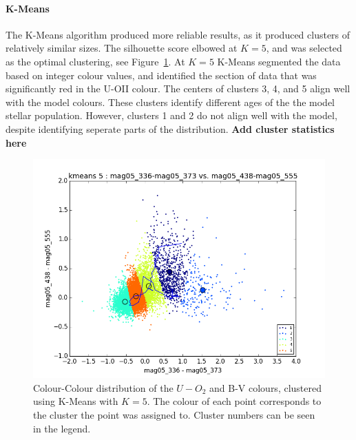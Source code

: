 \paragraph{K-Means}
The K-Means algorithm produced more reliable results, as it produced clusters of relatively similar sizes.
The silhouette score elbowed at $K=5$, and was selected as the optimal clustering, see Figure~\ref{fig:UOII2dKM5}.
At $K=5$ K-Means segmented the data based on integer colour values, and identified the section of data that was significantly red in the U-OII colour.
The centers of clusters 3, 4, and 5 align well with the model colours.
These clusters identify different ages of the the model stellar population. However, clusters 1 and 2 do not align well with the model, despite identifying seperate parts of the distribution.
\textbf{Add cluster statistics here}

\begin{figure}
\centering
\includegraphics[width=\linewidth]{figs/successful/kmeans_color_5cl_mag05_336-mag05_373vsmag05_438-mag05_555}
\caption{Colour-Colour distribution of the $U-O_{2}$ and B-V colours, clustered using K-Means with $K=5$. The colour of each point corresponds to the cluster the point was assigned to. Cluster numbers can be seen in the legend.}
\label{fig:UOII2dKM5}
\end{figure}

